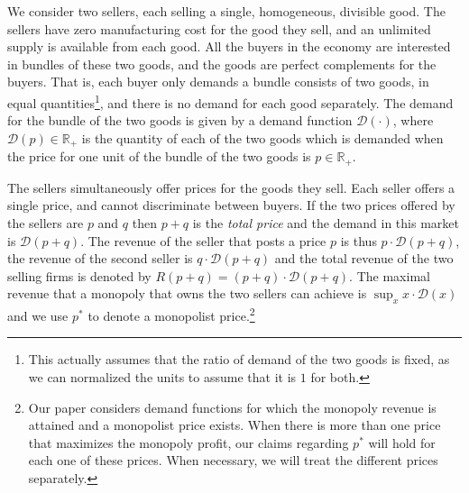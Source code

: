 \documentclass[11pt,a4paper]{article}
\begin{document}
We consider two sellers, each selling a single, homogeneous, divisible good.
The sellers have zero manufacturing cost for the good they sell, and an unlimited supply is available from each good.
All the buyers in the economy are interested in bundles of these two goods, and the goods are perfect complements for the buyers.
That is, each buyer only demands a bundle consists of two goods,
in equal quantities\footnote{This actually assumes that the ratio of demand of the two goods is fixed, as we can normalized the units to assume that it is $1$ for both.},
and there is no demand for each good separately.
The demand for the bundle of the two goods is given by
a demand function $\mathcal{D}(\cdot)$, where $\mathcal{D}(p)\in \mathbb{R}_+$ is the quantity
of each of the two goods which is demanded when the price for one unit of the bundle of the two goods is $p\in \mathbb{R}_+$.

The sellers simultaneously offer prices for the goods they sell. Each seller offers a single price, and cannot discriminate between buyers.
If the two prices offered by the sellers are $p$ and $q$ then  $p+q$ is the {\it total price} and the demand in this market is $\mathcal{D}(p+q)$.
The revenue of the seller that posts a price $p$ is thus $p\cdot \mathcal{D}(p+q)$, the revenue of the second seller is $q\cdot \mathcal{D}(p+q)$ and the total revenue
of the two selling firms is denoted by $R(p+q)= (p+q)\cdot \mathcal{D}(p+q)$.
The maximal revenue that a monopoly that owns the two sellers can achieve
is $\sup_x x\cdot \mathcal{D}(x)$ and we use $p^*$ to denote a monopolist price.\footnote{
Our paper considers demand functions for which the monopoly revenue is attained and a monopolist price exists.	
When there is more than one price that maximizes the monopoly profit, our claims regarding $p^*$ will hold for each one of these prices. When necessary, we will treat the different prices separately.
}

\vspace{2mm}
\end{document}

